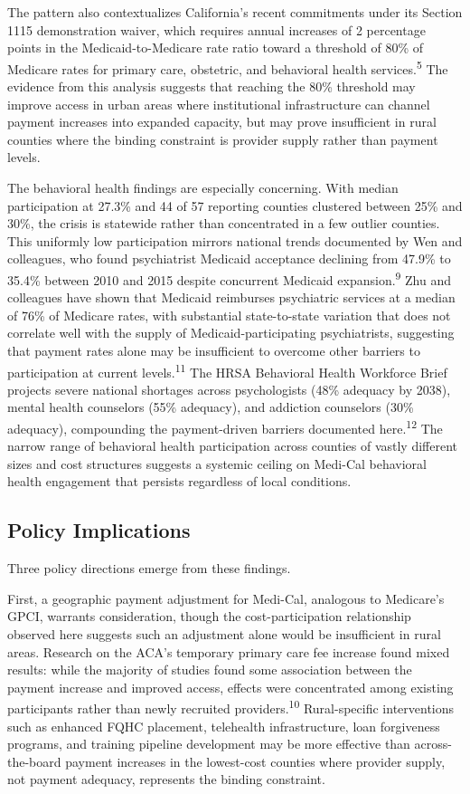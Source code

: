 \documentclass[12pt]{article}
\begin{document}
The pattern also contextualizes California's recent commitments under its Section 1115 demonstration waiver, which requires annual increases of 2 percentage points in the Medicaid-to-Medicare rate ratio toward a threshold of 80\% of Medicare rates for primary care, obstetric, and behavioral health services.\textsuperscript{5} The evidence from this analysis suggests that reaching the 80\% threshold may improve access in urban areas where institutional infrastructure can channel payment increases into expanded capacity, but may prove insufficient in rural counties where the binding constraint is provider supply rather than payment levels.

The behavioral health findings are especially concerning. With median participation at 27.3\% and 44 of 57 reporting counties clustered between 25\% and 30\%, the crisis is statewide rather than concentrated in a few outlier counties. This uniformly low participation mirrors national trends documented by Wen and colleagues, who found psychiatrist Medicaid acceptance declining from 47.9\% to 35.4\% between 2010 and 2015 despite concurrent Medicaid expansion.\textsuperscript{9} Zhu and colleagues have shown that Medicaid reimburses psychiatric services at a median of 76\% of Medicare rates, with substantial state-to-state variation that does not correlate well with the supply of Medicaid-participating psychiatrists, suggesting that payment rates alone may be insufficient to overcome other barriers to participation at current levels.\textsuperscript{11} The HRSA Behavioral Health Workforce Brief projects severe national shortages across psychologists (48\% adequacy by 2038), mental health counselors (55\% adequacy), and addiction counselors (30\% adequacy), compounding the payment-driven barriers documented here.\textsuperscript{12} The narrow range of behavioral health participation across counties of vastly different sizes and cost structures suggests a systemic ceiling on Medi-Cal behavioral health engagement that persists regardless of local conditions.

\subsection{Policy Implications}

Three policy directions emerge from these findings.

First, a geographic payment adjustment for Medi-Cal, analogous to Medicare's GPCI, warrants consideration, though the cost-participation relationship observed here suggests such an adjustment alone would be insufficient in rural areas. Research on the ACA's temporary primary care fee increase found mixed results: while the majority of studies found some association between the payment increase and improved access, effects were concentrated among existing participants rather than newly recruited providers.\textsuperscript{10} Rural-specific interventions such as enhanced FQHC placement, telehealth infrastructure, loan forgiveness programs, and training pipeline development may be more effective than across-the-board payment increases in the lowest-cost counties where provider supply, not payment adequacy, represents the binding constraint.
\end{document}
